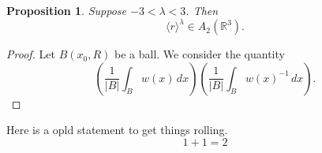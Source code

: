 \documentclass{article}
\newtheorem{proposition}{Proposition}
\begin{document}
\begin{proposition}
Suppose $-3 < \lambda < 3$. Then
\[
\langle r\rangle^\lambda \in A_2(\mathbb{R}^3).
\]
\end{proposition}

\begin{proof}
Let $B(x_0,R)$ be a ball. We consider the quantity
\[
\left(\frac{1}{|B|}\int_B w(x)\,dx\right)
\left(\frac{1}{|B|}\int_B w(x)^{-1}\,dx\right).
\]
\end{proof}
Here is a opld statement to get things rolling.
\[
    1 + 1 = 2
\]
\end{document}
